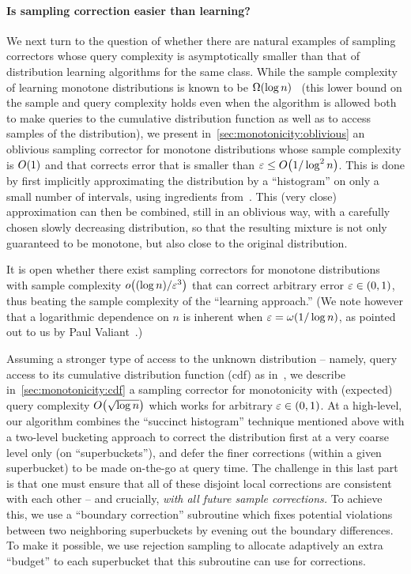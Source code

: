 \paragraph{Is sampling correction easier than learning?}
We next turn to the question of whether there are natural examples of sampling correctors whose query complexity is
asymptotically smaller 
than that of distribution learning algorithms for the same class. 
While the sample complexity of learning monotone 
distributions is known to be $\bigOmega{\log{n}}$~\cite{Birge:87} 
(this lower bound on the sample and query complexity
holds even when the algorithm is allowed both to make
queries to the cumulative distribution function
as well as to access samples of the distribution), 
we present in~\cref{sec:monotonicity:oblivious} an oblivious sampling corrector for 
monotone distributions whose sample complexity is $\bigO{1}$ {and} that corrects error that is smaller than $\eps \leq \bigO{1/\log^2{n}}$. 
This is done by first implicitly approximating the distribution by a ``histogram'' on only a small number of intervals, 
using ingredients from~\cite{Birge:87}. 
This (very close) approximation can 
then be combined, still in an oblivious way, with a carefully chosen slowly decreasing distribution, so that the resulting 
mixture is not only guaranteed to be monotone, but also close to the original distribution.

It is open whether there exist sampling correctors for monotone distributions
with sample complexity $\littleO{(\log n)/\eps^3}$ that can correct arbitrary error $\varepsilon\in(0,1)$, thus beating the sample complexity of the ``learning approach.'' (We note however that a logarithmic dependence on $n$ is inherent {when $\varepsilon = \omega(1/\log n)$}, as pointed out to us by Paul Valiant~\cite{Val:15:sketch}.)

Assuming a stronger type of access to the unknown distribution -- namely, query access to its cumulative distribution function (cdf) as in~\cite{BDKR:05,CR:14}, we 
describe in~\cref{sec:monotonicity:cdf} a sampling corrector for monotonicity with (expected) query complexity $\bigO{\sqrt{\log n}}$ {which works for arbitrary $\varepsilon\in(0,1)$}. At a high-level, our 
algorithm combines the ``succinct histogram'' technique mentioned above with a two-level bucketing approach to correct the distribution first at a very coarse level 
only (on ``superbuckets''), 
and defer the finer corrections (within a given superbucket) to be made on-the-go at query time. 
The challenge in this last part is that
one must ensure that all of these disjoint local 
 corrections are consistent with each other -- 
and crucially, \emph{with all future sample corrections.} 
 {To achieve this, we use a ``boundary correction'' subroutine which fixes potential violations between two neighboring superbuckets by evening out the boundary differences. To make it possible, we use rejection sampling to allocate adaptively an extra ``budget'' to each superbucket that this subroutine can use for corrections.}


